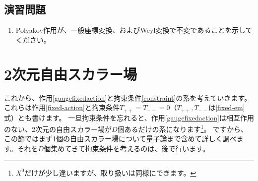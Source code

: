 \documentclass[report,paper=a4, fontsize=12pt, line_length=16cm, number_of_lines=34,dvipdfmx]{jlreq}
\numberwithin{equation}{chapter}
\numberwithin{equation}{section}
\begin{document}
\subsection*{演習問題}
\begin{enumerate}
\item Polyakov作用が、一般座標変換、およびWeyl変換で不変であることを示してください。
\end{enumerate}

\section{2次元自由スカラー場}
これから、作用\eqref{gaugefixedaction}と拘束条件\eqref{constraint}の系を考えていきます。
これらは作用\eqref{fixed-action}と拘束条件$T_{++}=T_{--}=0$（$T_{++},T_{--}$は\eqref{fixed-em}式）とも書けます。
一旦拘束条件を忘れると、作用\eqref{gaugefixedaction}は相互作用のない、2次元の自由スカラー場が$D$個あるだけの系になります\footnote{$X^0$だけが少し違いますが、取り扱いは同様にできます。}。
ですから、この節ではまず1個の自由スカラー場について量子論まで含めて詳しく調べます。それを$D$個集めてきて拘束条件を考えるのは、後で行います。
\end{document}
